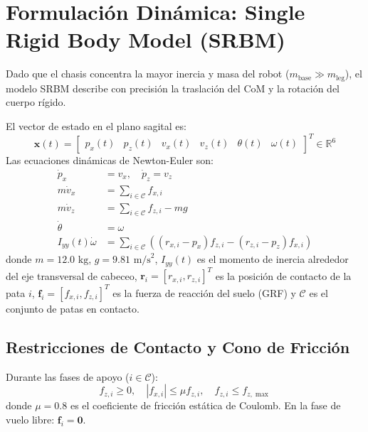 \documentclass[11pt,a4paper]{article}
\begin{document}
\section{Formulación Dinámica: Single Rigid Body Model (SRBM)}
Dado que el chasis concentra la mayor inercia y masa del robot ($m_{\text{base}} \gg m_{\text{leg}}$), el modelo SRBM describe con precisión la traslación del CoM y la rotación del cuerpo rígido.

El vector de estado en el plano sagital es:
\begin{equation}
\mathbf{x}(t) = \begin{bmatrix} p_x(t) & p_z(t) & v_x(t) & v_z(t) & \theta(t) & \omega(t) \end{bmatrix}^T \in \mathbb{R}^6
\end{equation}
Las ecuaciones dinámicas de Newton-Euler son:
\begin{align}
\dot{p}_x &= v_x, \quad \dot{p}_z = v_z \\
m \dot{v}_x &= \sum_{i \in \mathcal{C}} f_{x,i} \\
m \dot{v}_z &= \sum_{i \in \mathcal{C}} f_{z,i} - m g \\
\dot{\theta} &= \omega \\
I_{yy}(t) \dot{\omega} &= \sum_{i \in \mathcal{C}} \left( (r_{x,i} - p_x) f_{z,i} - (r_{z,i} - p_z) f_{x,i} \right)
\end{align}
donde $m = 12.0\text{ kg}$, $g = 9.81\text{ m/s}^2$, $I_{yy}(t)$ es el momento de inercia alrededor del eje transversal de cabeceo, $\mathbf{r}_i = [r_{x,i}, r_{z,i}]^T$ es la posición de contacto de la pata $i$, $\mathbf{f}_i = [f_{x,i}, f_{z,i}]^T$ es la fuerza de reacción del suelo (GRF) y $\mathcal{C}$ es el conjunto de patas en contacto.

\subsection{Restricciones de Contacto y Cono de Fricción}
Durante las fases de apoyo ($i \in \mathcal{C}$):
\begin{equation}
f_{z,i} \ge 0, \quad |f_{x,i}| \le \mu f_{z,i}, \quad f_{z,i} \le f_{z,\max}
\end{equation}
donde $\mu = 0.8$ es el coeficiente de fricción estática de Coulomb. En la fase de vuelo libre: $\mathbf{f}_i = \mathbf{0}$.
\end{document}
